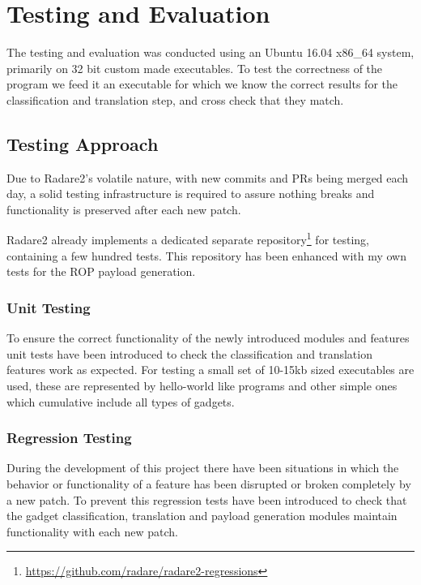 \chapter{Testing and Evaluation}
\label{chapter:testing}

The testing and evaluation was conducted using an Ubuntu 16.04 x86_64 system, primarily on 32 bit custom made executables. To test the correctness of the program we feed it an executable for which we know the correct results for the classification and translation step, and cross check that they match.

\section{Testing Approach}

Due to Radare2's volatile nature, with new commits and PRs being merged each day, a solid testing infrastructure is required to assure nothing breaks and functionality is preserved after each new patch.

Radare2 already implements a dedicated separate repository\footnote{\url{https://github.com/radare/radare2-regressions}} for testing, containing a few hundred tests. This repository has been enhanced with my own tests for the ROP payload generation.

\subsection{Unit Testing}

To ensure the correct functionality of the newly introduced modules and features unit tests have been introduced to check the classification and translation features work as expected. For testing a small set of 10-15kb sized executables are used, these are represented by hello-world like programs and other simple ones which cumulative include all types of gadgets.

\subsection{Regression Testing}

During the development of this project there have been situations in which the behavior or functionality of a feature has been disrupted or broken completely by a new patch. To prevent this regression tests have been introduced to check that the gadget classification, translation and payload generation modules maintain functionality with each new patch.

